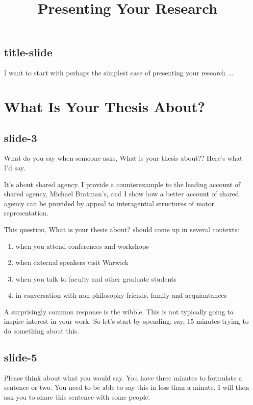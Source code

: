 \documentclass[12pt,\papersize]{extarticle}
\begin{document}
\setlength\footnotesep{1em}






\title {Presenting Your Research}
 
 
 
\maketitle
 
\subsection{title-slide}
I want to start with perhaps the simplest case of presenting your research ...
 
 
 
\section{What Is Your Thesis About?}
 
\subsection{slide-3}
What do you say when someone asks, What is your thesis about??
Here's what I'd say.
 
It's about shared agency.  I provide a counterexample to the leading account of shared agency,
Michael Bratman's, and I show how a better account of shared agency can be provided by appeal to 
interagential structures of motor representation.
 
This question, What is your thesis about? should come up in several contexts:
\begin{enumerate}
\item when you attend conferences and workshops
\item when external speakers visit Warwick
\item when you talk to faculty and other graduate students
\item in conversation with non-philosophy friends, family and acquiantances
\end{enumerate}
 
A surprisingly common response is the wibble.
This is not typically going to inspire interest in your work.
So let's start by spending, say, 15 minutes trying to do something about this.
 
\subsection{slide-5}
Please think about what you would say.  You have three minutes to formulate a sentence or two.
You need to be able to say this in less than a minute.
I will then ask you to share this sentence with some people.
 
\end{document}
